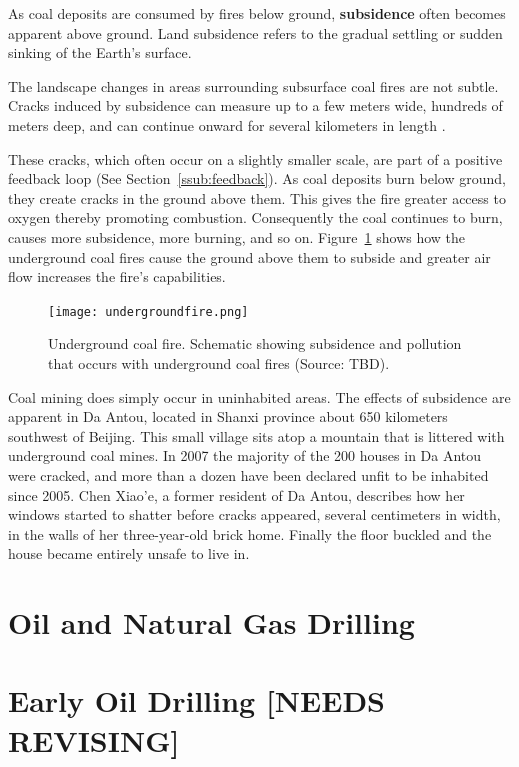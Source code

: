 As coal deposits are consumed by fires below ground, \textbf{subsidence} often becomes apparent above ground. Land subsidence refers to the gradual settling or sudden sinking of the Earth's surface. 

The landscape changes in areas surrounding subsurface coal fires are not subtle. Cracks induced by subsidence can measure up to a few meters wide, hundreds of meters deep, and can continue onward for several kilometers in length \citep{stracher2007coal}. %

These cracks, which often occur on a slightly smaller scale, are part of a positive feedback loop (See Section~\ref{ssub:feedback}). %
As coal deposits burn below ground, they create cracks in the ground above them. This gives the fire greater access to oxygen thereby promoting combustion. Consequently the coal continues to burn, causes more subsidence, more burning, and so on. Figure~\ref{fig:undergroundfire} shows how the underground coal fires cause the ground above them to subside and greater air flow increases the fire's capabilities. 


\begin{figure}[ht]
\centering
    \texttt{[image: undergroundfire.png]}
    \caption{Underground coal fire. Schematic showing subsidence and pollution that occurs with underground coal fires (Source: TBD). }
    \label{fig:undergroundfire}
\end{figure}

Coal mining does simply occur in uninhabited areas. The effects of subsidence are apparent in Da Antou, located in Shanxi province about 650 kilometers southwest of Beijing. This small village sits atop a mountain that is littered with underground coal mines. In 2007 the majority of the 200 houses in Da Antou were cracked, and more than a dozen have been declared unfit to be inhabited since 2005. Chen Xiao'e, a former resident of Da Antou, describes how her windows started to shatter before cracks appeared, several centimeters in width, in the walls of her three-year-old brick home. Finally the floor buckled and the house became entirely unsafe to live in. 

\section{Oil and Natural Gas Drilling}

\section{Early Oil Drilling [NEEDS REVISING]}

